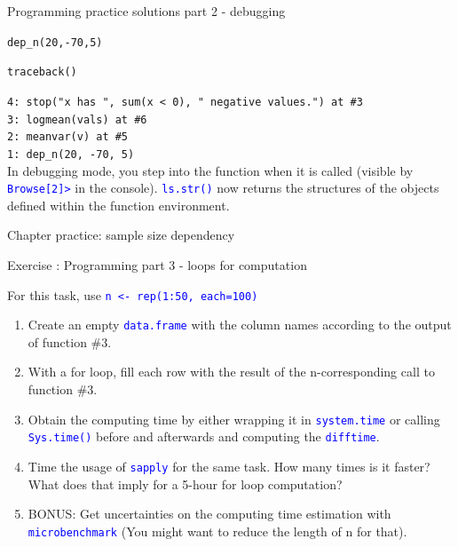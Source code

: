 \documentclass[xcolor=table,           xcolor=dvipsnames]{beamer}\usepackage[]{graphicx}\usepackage[]{color}
\makeatletter
\newcommand{\hlnum}[1]{\textcolor[rgb]{0,0,0}{#1}}
\newcommand{\hlopt}[1]{\textcolor[rgb]{0,0,0}{#1}}
\newcommand{\hlstd}[1]{\textcolor[rgb]{0,0,0}{#1}}
\newcommand{\hlkwd}[1]{\textcolor[rgb]{0,0,1}{#1}}
\newenvironment{kframe}{%
 \def\at@end@of@kframe{}%
 \ifinner\ifhmode%
  \def\at@end@of@kframe{\end{minipage}}%
  \begin{minipage}{\columnwidth}%
 \fi\fi%
 \def\FrameCommand##1{\hskip\@totalleftmargin \hskip-\fboxsep
 \colorbox{shadecolor}{##1}\hskip-\fboxsep
     \hskip-\linewidth \hskip-\@totalleftmargin \hskip\columnwidth}%
 \MakeFramed {\advance\hsize-\width
   \@totalleftmargin\z@ \linewidth\hsize
   \@setminipage}}%
 {\par\unskip\endMakeFramed%
 \at@end@of@kframe}
\newenvironment{knitrout}{}{} %
\newcounter{exercisecount}
\newenvironment{exercise}[1]
{%
\stepcounter{exercisecount}
\begin{block}{Exercise \arabic{exercisecount}: #1}
}
{%
\end{block} }
\newcommand{\rcode}[1]{\texttt{\textcolor{Blue}{#1}}} %
\makeatother
\begin{document}
\begin{frame}[fragile]{Programming practice solutions part 2 - debugging}
\begin{knitrout}
\color{fgcolor}\begin{kframe}
\begin{alltt}
\hlkwd{dep_n}\hlstd{(}\hlnum{20}\hlstd{,} \hlopt{-}\hlnum{70}\hlstd{,}\hlnum{5}\hlstd{)}
\end{alltt}


{\ttfamily\noindent\bfseries\color{errorcolor}{\#\# Error in logmean(vals): x has 20 negative values.}}\end{kframe}
\end{knitrout}
\begin{knitrout}
\color{fgcolor}\begin{kframe}
\begin{alltt}
\hlkwd{traceback}\hlstd{()}
\end{alltt}
\end{kframe}
\end{knitrout}
\texttt{4: stop("x has ", sum(x < 0), " negative values.") at \#3\\
3: logmean(vals) at \#6\\
2: meanvar(v) at \#5\\
1: dep\_n(20, -70, 5)}\\[1em]
In debugging mode, you step into the function when it is called (visible by \rcode{Browse[2]>} in the console). \rcode{ls.str()} now returns the structures of the objects defined within the function environment.
\end{frame}


\begin{frame}[fragile]{Chapter practice: sample size dependency}
\begin{exercise}{Programming part 3 - loops for computation}
For this task, use \rcode{n <- rep(1:50, each=100)}
\begin{enumerate}
\item Create an empty \rcode{data.frame} with the column names according to the output of function \#3.
\item With a for loop, fill each row with the result of the n-corresponding call to function \#3.
\item Obtain the computing time by either wrapping it in \rcode{system.time} or calling \rcode{Sys.time()} before and afterwards and computing the \rcode{difftime}.
\item Time the usage of \rcode{sapply} for the same task. How many times is it faster? What does that imply for a 5-hour for loop computation?
\item BONUS: Get uncertainties on the computing time estimation with \rcode{microbenchmark} (You might want to reduce the length of n for that).
\end{enumerate}
\end{exercise}
\end{frame}
\end{document}
